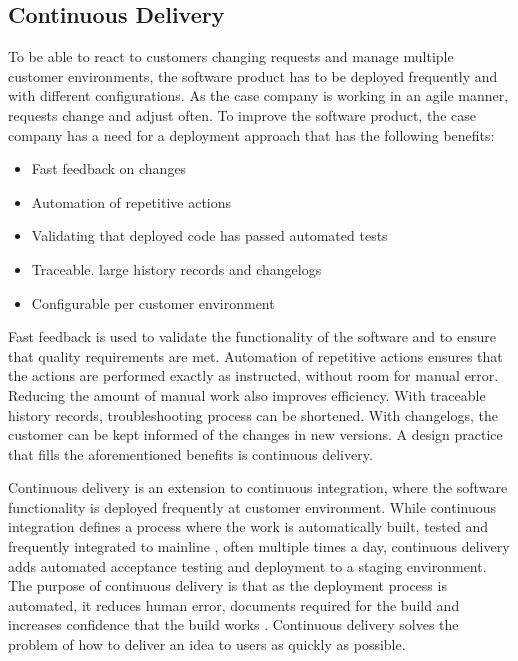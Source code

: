 \documentclass[english]{tktltiki2}
\theoremstyle{definition}
\theoremstyle{remark}
\begin{document}



\subsection{Continuous Delivery}
To be able to react to customers changing requests and manage multiple customer environments, the software product has to be deployed frequently and with different configurations. As the case company is working in an agile manner, requests change and adjust often. To improve the software product, the case company has a need for a deployment approach that has the following benefits:

\begin{itemize}
\item Fast feedback on changes
\item Automation of repetitive actions
\item Validating that deployed code has passed automated tests 
\item Traceable. large history records and changelogs
\item Configurable per customer environment
\end{itemize}

Fast feedback is used to validate the functionality of the software and to ensure that quality requirements are met. Automation of repetitive actions ensures that the actions are performed exactly as instructed, without room for manual error. Reducing the amount of manual work also improves efficiency. With traceable history records, troubleshooting process can be shortened. With changelogs, the customer can be kept informed of the changes in new versions. A design practice that fills the aforementioned benefits is continuous delivery.

Continuous delivery is an extension to continuous integration, where the software functionality is deployed frequently at customer environment. While continuous integration defines a process where the work is automatically built, tested and frequently integrated to mainline \cite{fowler2006continuous}, often multiple times a day, continuous delivery adds automated acceptance testing and deployment to a staging environment. The purpose of continuous delivery is that as the deployment process is automated, it reduces human error, documents required for the build and increases confidence that the build works \cite{cdbook}. Continuous delivery solves the problem of how to deliver an idea to users as quickly as possible.
\end{document}

